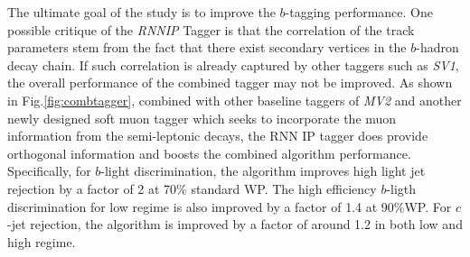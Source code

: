 \label{sec:rnn-result-combination}
The ultimate goal of the study is to improve the $b$-tagging performance. One possible critique of the \textit{RNNIP} Tagger is that the correlation of the track parameters stem from the fact that there exist secondary vertices in the $b$-hadron decay chain. If such correlation is already captured by other taggers such as \textit{SV1}, the overall performance of the combined tagger may not be improved. As shown in Fig.\ref{fig:combtagger}, combined with other baseline taggers of \textit{MV2} and another newly designed soft muon tagger which seeks to incorporate the muon information from the semi-leptonic decays, the RNN IP tagger does provide orthogonal information and boosts the combined algorithm performance\cite{ATL-PHYS-PUB-2017-013}. Specifically, for $b$-light discrimination, the algorithm improves high \pt light jet rejection by a factor of 2 at 70\% standard WP. The high efficiency $b$-ligth discrimination for low \pt regime is also improved by a factor of 1.4 at 90\%WP. For $c$-jet rejection, the algorithm is improved by a factor of around 1.2 in both low and high \pt regime. 


